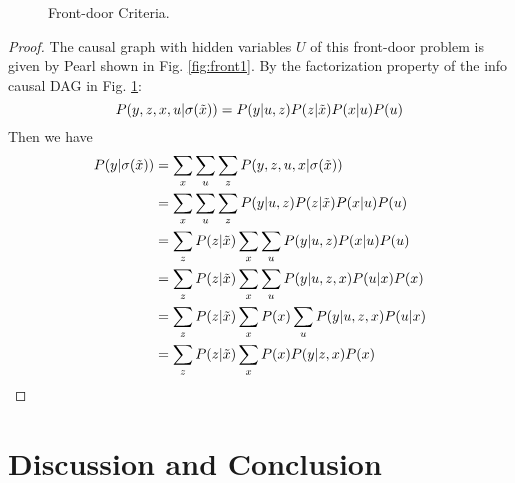 \begin{Thm}
\begin{figure}[h]
		\caption{Front-door Criteria.}
		\label{fig:front2}
	\end{figure}
	
\end{Thm}

\begin{proof}
	The causal graph with hidden variables $U$ of this front-door problem is given by Pearl \cite{Pearl2009} shown in Fig. \ref{fig:front1}. By the factorization property of the info causal DAG in Fig. \ref{fig:front2}:
	\begin{equation}
	\label{eq:front}
	P(y, z, x, u| \mathrm{\sigma}(\tilde{x}) )= P(y|u,z) P(z|\tilde{x}) P(x|u) P(u)
	\end{equation}
	Then we have
	\begin{align*}
	P(y|\mathrm{\sigma}(\tilde{x})) &= \sum_x \sum_u \sum_z P(y, z, u, x| \mathrm{\sigma}(\tilde{x}) ) \\
	&= \sum_x \sum_u \sum_z P(y|u,z) P(z|\tilde{x}) P(x|u) P(u)  \\
	&= \sum_{z} P(z|\tilde{x}) \sum_x \sum_u P(y|u,z)  P(x|u) P(u) \\
	&= \sum_{z} P(z|\tilde{x}) \sum_x \sum_u P(y|u,z, x)  P(u|x) P(x) \\
	&= \sum_{z} P(z|\tilde{x}) \sum_x P(x) \sum_u P(y|u,z, x)  P(u|x) \\
	&= \sum_{z} P(z|\tilde{x}) \sum_x P(x)  P(y|z, x)  P(x) 
	\end{align*}
	
\end{proof}



\section{Discussion and Conclusion}

%
%
%

